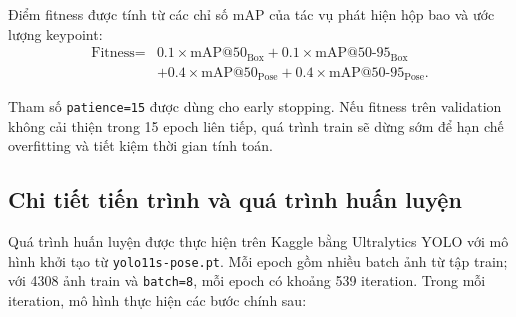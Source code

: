 \documentclass[12pt, a4paper]{article}
\begin{document}
Điểm fitness được tính từ các chỉ số mAP của tác vụ phát hiện hộp bao và ước lượng keypoint:
\begin{equation}
\begin{aligned}
    \text{Fitness} ={}& 0.1 \times \text{mAP@50}_{\text{Box}}
    + 0.1 \times \text{mAP@50-95}_{\text{Box}} \\
    &+ 0.4 \times \text{mAP@50}_{\text{Pose}}
    + 0.4 \times \text{mAP@50-95}_{\text{Pose}} .
\end{aligned}
\end{equation}

Tham số \texttt{patience=15} được dùng cho early stopping.
Nếu fitness trên validation không cải thiện trong 15 epoch liên tiếp, quá trình train sẽ dừng sớm để hạn chế overfitting và tiết kiệm thời gian tính toán.

\subsection{Chi tiết tiến trình và quá trình huấn luyện}
\label{subsec:training_process}
Quá trình huấn luyện được thực hiện trên Kaggle bằng Ultralytics YOLO với mô hình khởi tạo từ \texttt{yolo11s-pose.pt}.
Mỗi epoch gồm nhiều batch ảnh từ tập train; với 4308 ảnh train và \texttt{batch=8}, mỗi epoch có khoảng 539 iteration.
Trong mỗi iteration, mô hình thực hiện các bước chính sau:
\end{document}

